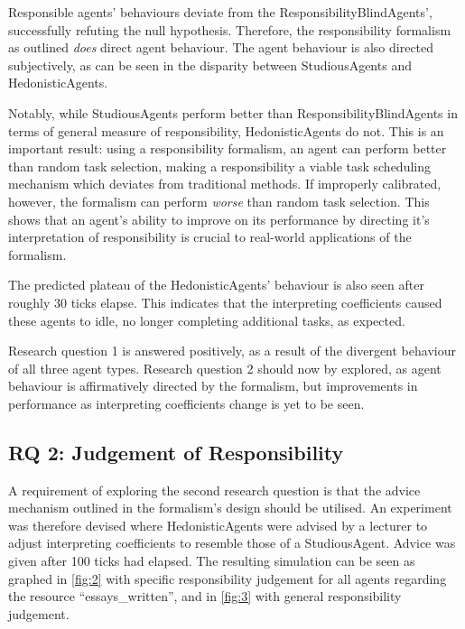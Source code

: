 Responsible agents' behaviours deviate from the ResponsibilityBlindAgents', successfully refuting the null hypothesis. Therefore, the responsibility formalism as outlined \emph{does} direct agent behaviour. The agent behaviour is also directed subjectively, as can be seen in the disparity between StudiousAgents and HedonisticAgents.\par

Notably, while StudiousAgents perform better than ResponsibilityBlindAgents in terms of general measure of responsibility, HedonisticAgents do not. This is an important result: using a responsibility formalism, an agent can perform better than random task selection, making a responsibility a viable task scheduling mechanism which deviates from traditional methods. If improperly calibrated, however, the formalism can perform \emph{worse} than random task selection. This shows that an agent's ability to improve on its performance by directing it's interpretation of responsibility is crucial to real-world applications of the formalism.\par

The predicted plateau of the HedonisticAgents' behaviour is also seen after roughly 30 ticks elapse. This indicates that the interpreting coefficients caused these agents to idle, no longer completing additional tasks, as expected.\par

Research question 1 is answered positively, as a result of the divergent behaviour of all three agent types. Research question 2 should now by explored, as agent behaviour is affirmatively directed by the formalism, but improvements in performance as interpreting coefficients change is yet to be seen.\par

\subsection{RQ 2: Judgement of Responsibility}\label{subsec:RQ2}
A requirement of exploring the second research question is that the advice mechanism outlined in the formalism's design should be utilised. An experiment was therefore devised where HedonisticAgents were advised by a lecturer to adjust interpreting coefficients to resemble those of a StudiousAgent. Advice was given after 100 ticks had elapsed. The resulting simulation can be seen as graphed in \cref{fig:2} with specific responsibility judgement for all agents regarding the resource ``essays\_written'', and in \cref{fig:3} with general responsibility judgement.

